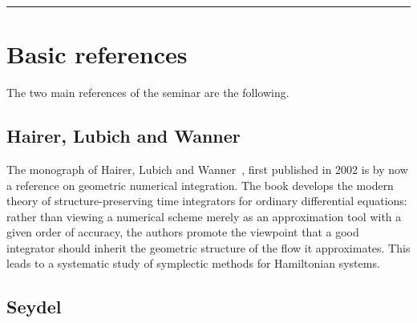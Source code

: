\documentclass[11pt]{article}
\begin{document}
\vspace{0.5cm}
\hrule
\vspace{0.5cm}

\section{Basic references}

The two main references of the seminar are the following.

\subsection{Hairer, Lubich and Wanner}

The monograph of
Hairer, Lubich and Wanner~\cite{hairer2006}, first published in
2002 is by now a reference on geometric numerical
integration. The book develops the modern theory of
structure-preserving time integrators for ordinary differential
equations: rather than viewing a numerical scheme merely as an
approximation tool with a given order of accuracy, the authors
promote the viewpoint that a good integrator should inherit the
geometric structure of the flow it approximates. This leads to a
systematic study of symplectic methods for Hamiltonian systems.


\subsection{Seydel}
\end{document}
